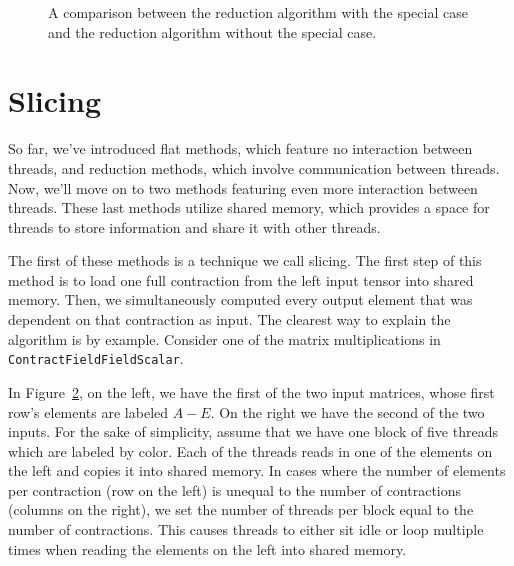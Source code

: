 \begin{figure}
{	\label{fig:CFFSWithoutSpecialReduction}}
    \caption{A comparison between the reduction algorithm with the special case and the reduction algorithm without the special case.}
\label{CFFSTeamReduceSpecialCaseGraph}
\end{figure}



\section{Slicing} \label{slicing}
So far, we've introduced flat methods, which feature no interaction between threads, and reduction
methods, which involve communication between threads. Now, we'll move on to two methods
featuring even more interaction between threads. These last methods utilize shared memory, 
which provides a space for threads to store information and share it with other threads. 

The first of these methods is a technique we call slicing. The first
step of this method is to load one full contraction from the left input tensor into
shared memory. Then, we simultaneously computed every output element that was
dependent on that contraction as input. The clearest way to explain the
algorithm is by example. Consider one of the matrix multiplications in
\texttt{ContractFieldFieldScalar}. 

\begin{figure}
    \centering
    \label{fig:Slicing}
\end{figure}

    In Figure~\ref{fig:Slicing}, on the left, we have the first of the two input matrices, whose first row's
elements are labeled $A-E$. On the right we have the second of the two inputs.
For the sake of simplicity, assume that we have one block of five threads which
are labeled by color. Each of the threads reads in one of the elements on the
left and copies it into shared memory. In cases where the number of elements
per contraction (row on the left) is unequal to the number of contractions
(columns on the right), we set the number of threads per block equal to the
number of contractions. This causes threads to either sit idle or loop multiple
times when reading the elements on the left into shared memory.
	
